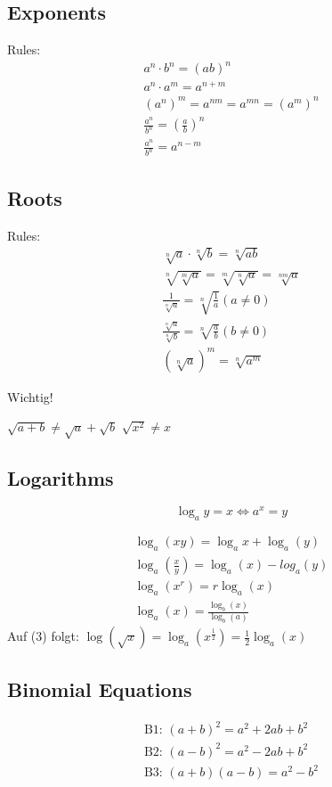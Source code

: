 \documentclass{article}
\begin{document}
\subsection{Exponents}
Rules:
\begin{align*}
    a^n \cdot b^n = (ab)^n \\
    a^n \cdot a^m = a^{n+m} \\
	(a^n)^m = a^{nm}=a^{mn}=(a^{m})^{n} \\ 
	\frac{a^n}{b^n}=(\frac{a}{b})^n \\ 
    \frac{a^n}{b^n}=a^{n-m}
\end{align*}

\subsection{Roots}
Rules:
\begin{align*}
    \sqrt[n]{a} \cdot \sqrt[n]{b} = \sqrt[n]{ab} \\ 
    \sqrt[n]{\sqrt[m]{a}} = \sqrt[m]{\sqrt[n]{a}} = \sqrt[nm]{a} \\
    \frac{1}{\sqrt[n]{a}} = \sqrt[n]{\frac{1}{a}} (a \neq 0) \\ 
    \frac{\sqrt[n]{a}}{\sqrt[n]{b}} = \sqrt[n]{\frac{a}{b}} (b \neq 0) \\ 
    (\sqrt[n]{a})^m = \sqrt[n]{a^m}
\end{align*}

Wichtig!

$\sqrt{a+b} \neq \sqrt{a} + \sqrt{b}$
$\sqrt{x^2} \neq x $

\subsection{Logarithms}

$$ \log_a{y} = x \Leftrightarrow a^x = y $$

\begin{align}
    \log_a(xy) = \log_a{x} + \log_a(y) \\ 
    \log_a(\frac{x}{y})=\log_a(x) - log_a(y) \\ 
    \log_a(x^r) = r \log_a(x) \\
    \log_a(x) = \frac{\log_b(x)}{\log_b(a)}
\end{align}
Auf (3) folgt:
$\log(\sqrt{x}) = \log_a(x^{\frac{1}{2}})=\frac{1}{2} \log_a(x)$


\subsection{Binomial Equations}
\begin{align*}
    \text{B1: }(a+b)^2 = a^2 +2ab +b^2 \\ 
    \text{B2: }(a-b)^2 = a^2 -2ab +b^2 \\
    \text{B3: }(a+b)(a-b) = a^2 - b^2
\end{align*}
\end{document}
